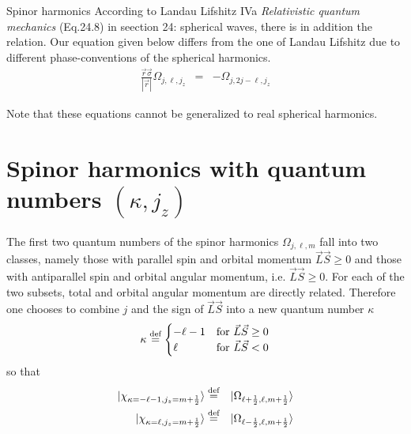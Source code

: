 \documentclass[11pt,a4paper]{report}
\begin{document}
\begin{myshadowminipage}{Spinor harmonics}
According to Landau Lifshitz IVa \textit{Relativistic quantum
  mechanics} (Eq.24.8) in seection 24: spherical waves, there is in
addition the relation. Our equation given below differs from the one
of Landau Lifshitz due to different phase-conventions of the spherical
harmonics.
\begin{eqnarray*}
\frac{\vec{r}\vec{\sigma}}{|\vec{r}|}\Omega_{j,\ell,j_z}&=&-\Omega_{j,2j-\ell,j_z}
\end{eqnarray*}

Note that these equations cannot be generalized to real spherical harmonics.
\end{myshadowminipage}



\section{Spinor harmonics with quantum numbers $(\kappa,j_z)$}
The first two quantum numbers of the spinor harmonics
$\Omega_{j,\ell,m}$ fall into two classes, namely those with parallel
spin and orbital momentum $\vec{L}\vec{S}\ge0$ and those with
antiparallel spin and orbital angular momentum,
i.e. $\vec{L}\vec{S}\ge0$. For each of the two subsets, total and
orbital angular momentum are directly related.  Therefore one chooses
to combine $j$ and the sign of $\vec{L}\vec{S}$ into a new quantum
number $\kappa$
\begin{eqnarray}
\kappa\stackrel{\text{def}}{=}
\begin{cases}
-\ell-1 &\text{for $\vec{L}\vec{S}\ge0$}\\
\ell &\text{for $\vec{L}\vec{S}<0$}\\
\end{cases}
\end{eqnarray}
so that
\begin{eqnarray}
|\chi_{\kappa=-\ell-1,j_z=m+\frac{1}{2}}\rangle
&\stackrel{\text{def}}{=}&|\Omega_{\ell+\frac{1}{2},\ell,m+\frac{1}{2}}\rangle
\nonumber\\
|\chi_{\kappa=\ell,j_z=m+\frac{1}{2}}\rangle
&\stackrel{\text{def}}{=}&|\Omega_{\ell-\frac{1}{2},\ell,m+\frac{1}{2}}\rangle
\end{eqnarray}
\end{document}
